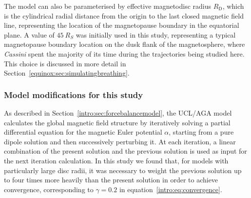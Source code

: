 The model can also be parameterised by effective magnetodisc radius $R_\mathrm{D}$, which is the cylindrical radial distance from the origin to the last closed magnetic field line, representing the location of the magnetopause boundary in the equatorial plane. A value of $\SI{45}{R_S}$ was initially used in this study, representing a typical magnetopause boundary location on the dusk flank of the magnetosphere, where \textit{Cassini} spent the majority of its time during the trajectories being studied here. This choice is discussed in more detail in Section~\ref{equinox:sec:simulatingbreathing}.

\subsubsection{Model modifications for this study}\label{equinox:sec:modmodifications}
As described in Section~\ref{intro:sec:forcebalancemodel}, the UCL/AGA model calculates the global magnetic field structure by iteratively solving a partial differential equation for the magnetic Euler potential $\alpha$, starting from a pure dipole solution and then successively perturbing it. At each iteration, a linear combination of the present solution and the previous solution is used as input for the next iteration calculation. In this study we found that, for models with particularly large disc radii, it was necessary to weight the previous solution up to four times more heavily than the present solution in order to achieve convergence, corresponding  to $\gamma=0.2$ in equation~\ref{intro:eq:convergence}.

